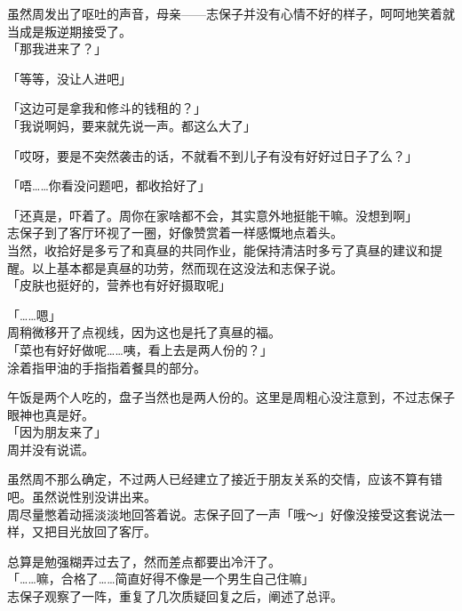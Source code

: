 虽然周发出了呕吐的声音，母亲——志保子并没有心情不好的样子，呵呵地笑着就当成是叛逆期接受了。\\

「那我进来了？」

「等等，没让人进吧」

「这边可是拿我和修斗的钱租的？」\\

「我说啊妈，要来就先说一声。都这么大了」

「哎呀，要是不突然袭击的话，不就看不到儿子有没有好好过日子了么？」

「唔……你看没问题吧，都收拾好了」

「还真是，吓着了。周你在家啥都不会，其实意外地挺能干嘛。没想到啊」\\

志保子到了客厅环视了一圈，好像赞赏着一样感慨地点着头。\\

当然，收拾好是多亏了和真昼的共同作业，能保持清洁时多亏了真昼的建议和提醒。以上基本都是真昼的功劳，然而现在这没法和志保子说。\\

「皮肤也挺好的，营养也有好好摄取呢」

「……嗯」\\

周稍微移开了点视线，因为这也是托了真昼的福。\\

「菜也有好好做呢……咦，看上去是两人份的？」\\

涂着指甲油的手指指着餐具的部分。

午饭是两个人吃的，盘子当然也是两人份的。这里是周粗心没注意到，不过志保子眼神也真是好。\\

「因为朋友来了」\\

周并没有说谎。

虽然周不那么确定，不过两人已经建立了接近于朋友关系的交情，应该不算有错吧。虽然说性别没讲出来。\\

周尽量憋着动摇淡淡地回答着说。志保子回了一声「哦～」好像没接受这套说法一样，又把目光放回了客厅。

总算是勉强糊弄过去了，然而差点都要出冷汗了。\\

「……嘛，合格了……简直好得不像是一个男生自己住嘛」\\

志保子观察了一阵，重复了几次质疑回复之后，阐述了总评。

